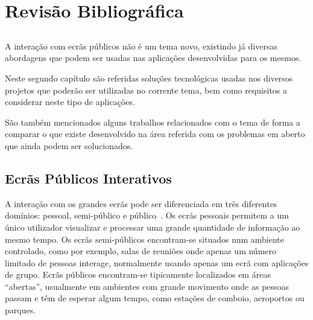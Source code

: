 \chapter{Revisão Bibliográfica} \label{chap:biblio}

\section*{}

A interação com ecrãs públicos não é um tema novo, existindo já diversas abordagens que podem ser usadas nas aplicações desenvolvidas para os mesmos.
	
Neste segundo capítulo são referidas soluções tecnológicas usadas nos diversos projetos que poderão ser utilizadas no corrente tema, bem como requisitos a considerar neste tipo de aplicações.

São também mencionados alguns trabalhos relacionados com o tema de forma a comparar o que existe desenvolvido na área referida com os problemas em aberto que ainda podem ser solucionados. 

\section{Ecrãs Públicos Interativos}

A interação com os grandes ecrãs pode ser diferenciada em três diferentes domínios: pessoal, semi-público e público~\cite{Ballagas}. Os ecrãs pessoais permitem a um único utilizador visualizar e processar uma grande quantidade de informação ao mesmo tempo. Os ecrãs semi-públicos encontram-se situados  num ambiente controlado, como  por exemplo, salas de reuniões onde apenas um número limitado de pessoas interage, normalmente usando apenas um ecrã com aplicações de grupo. Ecrãs públicos encontram-se tipicamente localizados em áreas ``abertas'', usualmente em ambientes com grande movimento onde as pessoas passam e têm de esperar algum tempo, como estações de comboio, aeroportos ou parques.

